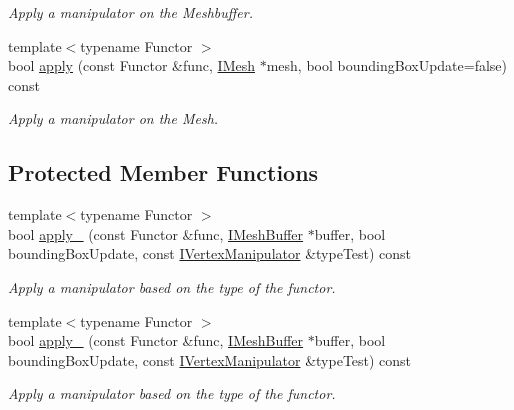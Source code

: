 \begin{DoxyCompactItemize}
\begin{DoxyCompactList}\small\item\em Apply a manipulator on the Meshbuffer. \end{DoxyCompactList}\item 
{\footnotesize template$<$typename Functor $>$ }\\bool \hyperlink{classirr_1_1scene_1_1IMeshManipulator_a5a69b634835f4314d93a192758f910da}{apply} (const Functor \&func, \hyperlink{classirr_1_1scene_1_1IMesh}{I\+Mesh} $\ast$mesh, bool bounding\+Box\+Update=false) const
\begin{DoxyCompactList}\small\item\em Apply a manipulator on the Mesh. \end{DoxyCompactList}\end{DoxyCompactItemize}
\subsection*{Protected Member Functions}
\begin{DoxyCompactItemize}
\item 
{\footnotesize template$<$typename Functor $>$ }\\bool \hyperlink{classirr_1_1scene_1_1IMeshManipulator_a774eccf79c86497b49b4dea7ead1eeb2}{apply\+\_\+} (const Functor \&func, \hyperlink{classirr_1_1scene_1_1IMeshBuffer}{I\+Mesh\+Buffer} $\ast$buffer, bool bounding\+Box\+Update, const \hyperlink{structirr_1_1scene_1_1IVertexManipulator}{I\+Vertex\+Manipulator} \&type\+Test) const
\begin{DoxyCompactList}\small\item\em Apply a manipulator based on the type of the functor. \end{DoxyCompactList}\item 
{\footnotesize template$<$typename Functor $>$ }\\bool \hyperlink{classirr_1_1scene_1_1IMeshManipulator_a774eccf79c86497b49b4dea7ead1eeb2}{apply\+\_\+} (const Functor \&func, \hyperlink{classirr_1_1scene_1_1IMeshBuffer}{I\+Mesh\+Buffer} $\ast$buffer, bool bounding\+Box\+Update, const \hyperlink{structirr_1_1scene_1_1IVertexManipulator}{I\+Vertex\+Manipulator} \&type\+Test) const
\begin{DoxyCompactList}\small\item\em Apply a manipulator based on the type of the functor. \end{DoxyCompactList}\end{DoxyCompactItemize}


